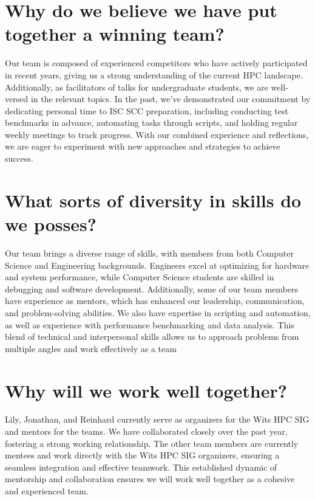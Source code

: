 \documentclass[10pt, onecolumn]{IEEEtran}
\begin{document}
\section{Why do we believe we have put together a winning team?}
\noindent
Our team is composed of experienced competitors who have actively participated in recent years, giving us a strong understanding of the current HPC landscape. Additionally, as facilitators of talks for undergraduate students, we are well-versed in the relevant topics. In the past, we've demonstrated our commitment by dedicating personal time to ISC SCC preparation, including conducting test benchmarks in advance, automating tasks through scripts, and holding regular weekly meetings to track progress. With our combined experience and reflections, we are eager to experiment with new approaches and strategies to achieve success.
\section{What sorts of diversity in skills do we posses?}
\noindent
Our team brings a diverse range of skills, with members from both Computer Science and Engineering backgrounds. Engineers excel at optimizing for hardware and system performance, while Computer Science students are skilled in debugging and software development. Additionally, some of our team members have experience as mentors, which has enhanced our leadership, communication, and problem-solving abilities. We also have expertise in scripting and automation, as well as experience with performance benchmarking and data analysis. This blend of technical and interpersonal skills allows us to approach problems from multiple angles and work effectively as a team
\section{Why will we work well together?} 
\noindent
Lily, Jonathan, and Reinhard currently serve as organizers for the Wits HPC SIG and mentors for the teams. We have collaborated closely over the past year, fostering a strong working relationship. The other team members are currently mentees and work directly with the Wits HPC SIG organizers, ensuring a seamless integration and effective teamwork. This established dynamic of mentorship and collaboration ensures we will work well together as a cohesive and experienced team.
\end{document}
